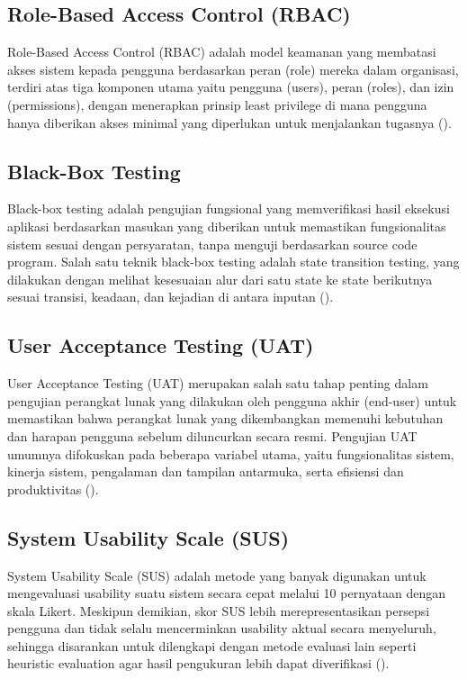 \subsection{Role-Based Access Control (RBAC)}
Role-Based Access Control (RBAC) adalah model keamanan yang membatasi akses sistem 
kepada pengguna berdasarkan peran (role) mereka dalam organisasi, terdiri atas tiga 
komponen utama yaitu pengguna (users), peran (roles), dan izin (permissions), 
dengan menerapkan prinsip least privilege di mana pengguna hanya diberikan akses 
minimal yang diperlukan untuk menjalankan tugasnya (\cite{MSahyudi2025}).

\subsection{Black-Box Testing}
Black-box testing adalah pengujian fungsional yang memverifikasi hasil eksekusi 
aplikasi berdasarkan masukan yang diberikan untuk memastikan fungsionalitas 
sistem sesuai dengan persyaratan, tanpa menguji berdasarkan source code program. 
Salah satu teknik black-box testing adalah state transition testing, yang 
dilakukan dengan melihat kesesuaian alur dari satu state ke state berikutnya 
sesuai transisi, keadaan, dan kejadian di antara inputan (\cite{Mintarsih2023}).

\subsection{User Acceptance Testing (UAT)}
User Acceptance Testing (UAT) merupakan salah satu tahap penting dalam pengujian 
perangkat lunak yang dilakukan oleh pengguna akhir (end-user) untuk memastikan 
bahwa perangkat lunak yang dikembangkan memenuhi kebutuhan dan harapan pengguna 
sebelum diluncurkan secara resmi. Pengujian UAT umumnya difokuskan pada beberapa 
variabel utama, yaitu fungsionalitas sistem, kinerja sistem, pengalaman dan 
tampilan antarmuka, serta efisiensi dan produktivitas (\cite{AliyahAliyah2025}).

\subsection{System Usability Scale (SUS)}
System Usability Scale (SUS) adalah metode yang banyak digunakan untuk 
mengevaluasi usability suatu sistem secara cepat melalui 10 pernyataan 
dengan skala Likert. Meskipun demikian, skor SUS lebih merepresentasikan 
persepsi pengguna dan tidak selalu mencerminkan usability aktual secara 
menyeluruh, sehingga disarankan untuk dilengkapi dengan metode evaluasi 
lain seperti heuristic evaluation agar hasil pengukuran lebih dapat 
diverifikasi (\cite{Fiandhika2024}).

